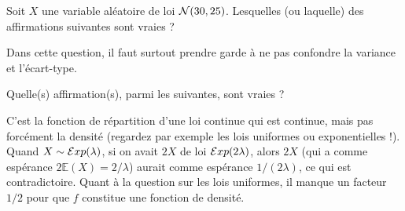 \begin{question}
Soit $X$ une variable aléatoire de loi ${\cal N}(30,25)$. Lesquelles (ou laquelle) des affirmations suivantes sont vraies ? 
\begin{answers}
\end{answers}
\begin{explanations}
Dans cette question, il faut surtout prendre garde à ne pas confondre la variance et l'écart-type. 
\end{explanations}
\end{question}


\begin{question}
Quelle(s) affirmation(s), parmi les suivantes, sont vraies ?
\begin{answers}
\end{answers}
\begin{explanations}
C'est la fonction de répartition d'une loi continue qui est continue, mais pas forcément la densité (regardez par exemple les lois uniformes ou exponentielles !). Quand $X\sim {\cal E}xp(\lambda)$, si on avait $2X$ de loi ${\cal E}xp(2\lambda)$, alors $2X$ (qui a comme espérance $2 \mathbb{E}(X)=2/\lambda$) aurait comme espérance $1/(2\lambda)$, ce qui est contradictoire. Quant à la question sur les lois uniformes, il manque un facteur $1/2$ pour que $f$ constitue une fonction de densité.
\end{explanations}
\end{question}


